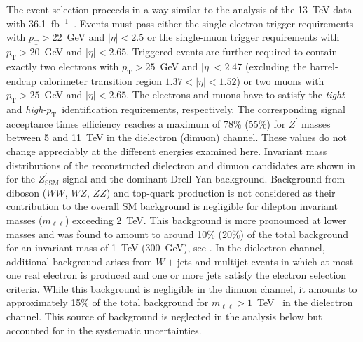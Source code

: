 The event selection proceeds in a way similar to the analysis of the 13~TeV data with
36.1~fb$^{-1}$~\cite{Aaboud:2017buh}.
Events must pass either the single-electron trigger requirements with $p_\mathrm{T} > 22$~GeV and
$|\eta| < 2.5$ or the single-muon trigger requirements with $p_\mathrm{T} > 20$~GeV and $|\eta| < 2.65$.
Triggered events are further required to contain exactly two electrons with $p_\mathrm{T} > 25$~GeV
and $|\eta|<2.47$ (excluding the barrel-endcap calorimeter transition region $1.37 < |\eta| < 1.52$)
or two muons with $p_\mathrm{T} > 25$~GeV and $|\eta| < 2.65$.
The electrons and muons have to satisfy the \textit{tight} and
\textit{high-$p_\mathrm{T}$}~identification requirements, respectively.
The corresponding signal acceptance times efficiency reaches a maximum of 78\% (55\%)
for $Z^\prime$ masses between 5 and 11~TeV in the dielectron (dimuon) channel.
These values do not change appreciably at the different \com energies examined here.
Invariant mass distributions of the reconstructed dielectron and dimuon candidates are shown
in  for the $Z^\prime_\mathrm{SSM}$ signal and the dominant
Drell-Yan background.
Background from diboson ($WW$, $WZ$, $ZZ$) and top-quark production is not considered as their
contribution to the overall SM background is negligible for dilepton invariant masses ($m_{\ell\ell}$)
exceeding 2~TeV. This background is more pronounced at lower masses and was found to amount to
around 10\% (20\%) of the total background for an invariant mass of 1~TeV (300~GeV),
see .
In the dielectron channel, additional background arises from $W+$jets and multijet events
in which at most one real electron is produced and one or more jets satisfy the electron selection
criteria. While this background is negligible in the dimuon channel, it amounts to approximately
15\% of the total background for $m_{\ell\ell} > 1$~TeV~\cite{Aaboud:2017buh} in the dielectron channel.
This source of background is neglected in the analysis below but accounted for in the systematic
uncertainties.
